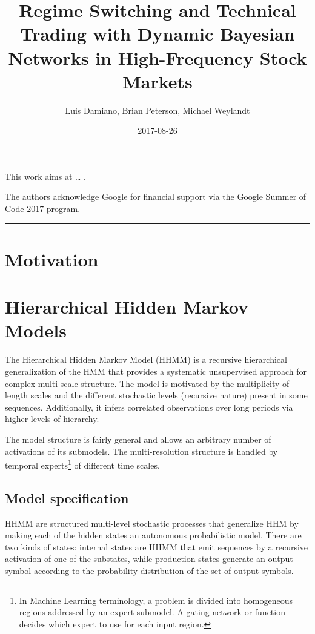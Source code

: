 \documentclass[]{article}
\title{Regime Switching and Technical Trading with Dynamic Bayesian Networks in
High-Frequency Stock Markets}
\author{Luis Damiano, Brian Peterson, Michael Weylandt}
\date{2017-08-26}
\let\rmarkdownfootnote\footnote%
\def\footnote{\protect\rmarkdownfootnote}
\begin{document}
\maketitle

{
\setcounter{tocdepth}{2}
\tableofcontents
}
This work aims at \ldots{} .

The authors acknowledge Google for financial support via the Google
Summer of Code 2017 program.

\begin{center}\rule{0.5\linewidth}{\linethickness}\end{center}

\section{Motivation}\label{motivation}

\section{Hierarchical Hidden Markov
Models}\label{hierarchical-hidden-markov-models}

The Hierarchical Hidden Markov Model (HHMM) is a recursive hierarchical
generalization of the HMM that provides a systematic unsupervised
approach for complex multi-scale structure. The model is motivated by
the multiplicity of length scales and the different stochastic levels
(recursive nature) present in some sequences. Additionally, it infers
correlated observations over long periods via higher levels of
hierarchy.

The model structure is fairly general and allows an arbitrary number of
activations of its submodels. The multi-resolution structure is handled
by temporal experts\footnote{In Machine Learning terminology, a problem
  is divided into homogeneous regions addressed by an expert submodel. A
  gating network or function decides which expert to use for each input
  region.} of different time scales.

\subsection{Model specification}\label{model-specification}

HHMM are structured multi-level stochastic processes that generalize HHM
by making each of the hidden states an autonomous probabilistic model.
There are two kinds of states: internal states are HHMM that emit
sequences by a recursive activation of one of the substates, while
production states generate an output symbol according to the probability
distribution of the set of output symbols.
\end{document}
